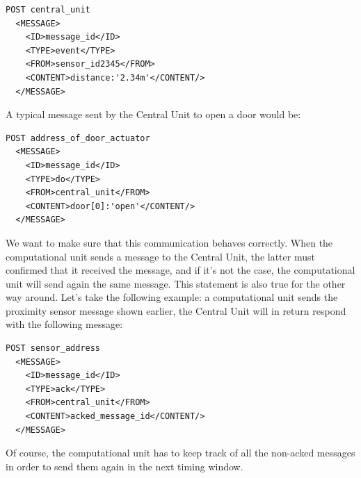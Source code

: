 \documentclass{acm_proc_article-sp}
\begin{document}
\begin{minipage}{\linewidth}
\begin{lstlisting}
POST central_unit 
  <MESSAGE>
    <ID>message_id</ID>
    <TYPE>event</TYPE>
    <FROM>sensor_id2345</FROM>
    <CONTENT>distance:'2.34m'</CONTENT/>
  </MESSAGE>
\end{lstlisting}
\end{minipage}

A typical message sent by the Central Unit to open a door would be:

\begin{minipage}{\linewidth}
\begin{lstlisting}
POST address_of_door_actuator
  <MESSAGE>
    <ID>message_id</ID>
    <TYPE>do</TYPE>
    <FROM>central_unit</FROM>
    <CONTENT>door[0]:'open'</CONTENT/>
  </MESSAGE> 
\end{lstlisting}
\end{minipage}

We want to make sure that this communication behaves correctly. 
When the computational unit sends a message to the Central Unit, the latter must confirmed that it received the message, and if it's not the case, 
the computational unit will send again the same message. 
This statement is also true for the other way around. 
Let's take the following example: a computational unit sends the proximity sensor message shown earlier, the Central Unit will in return respond with the following message:

\begin{minipage}{\linewidth}
\begin{lstlisting}
POST sensor_address
  <MESSAGE>
    <ID>message_id</ID>
    <TYPE>ack</TYPE>
    <FROM>central_unit</FROM>
    <CONTENT>acked_message_id</CONTENT/>
  </MESSAGE>
\end{lstlisting}
\end{minipage}

Of course, the computational unit has to keep track of all the non-acked messages in order to send them again in the next timing window.
\end{document}
